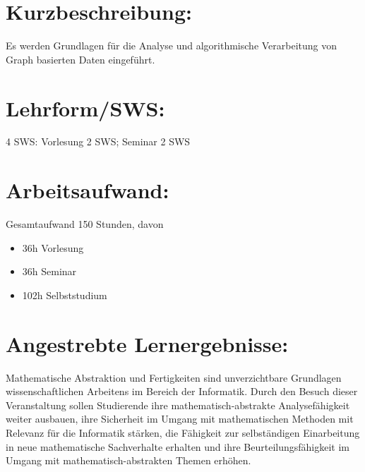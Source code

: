 \section*{Kurzbeschreibung:\label{/mi-2017/modulbeschreibungen-master/MA_All_Modul_Mathematik}}\label{kurzbeschreibungpathlabelmi-2017modulbeschreibungen-mastermaux5fallux5fmodulux5fmathematik}

Es werden Grundlagen für die Analyse und algorithmische Verarbeitung von
Graph basierten Daten eingeführt.

\section*{Lehrform/SWS:\label{/mi-2017/modulbeschreibungen-master/MA_All_Modul_Mathematik}}\label{lehrformswspathlabelmi-2017modulbeschreibungen-mastermaux5fallux5fmodulux5fmathematik}

4 SWS: Vorlesung 2 SWS; Seminar 2 SWS

\section*{Arbeitsaufwand:\label{/mi-2017/modulbeschreibungen-master/MA_All_Modul_Mathematik}}\label{arbeitsaufwandpathlabelmi-2017modulbeschreibungen-mastermaux5fallux5fmodulux5fmathematik}

Gesamtaufwand 150 Stunden, davon

\begin{itemize}
\tightlist
\item
  36h Vorlesung
\item
  36h Seminar
\item
  102h Selbststudium
\end{itemize}

\section*{Angestrebte
Lernergebnisse:\label{/mi-2017/modulbeschreibungen-master/MA_All_Modul_Mathematik}}\label{angestrebte-lernergebnissepathlabelmi-2017modulbeschreibungen-mastermaux5fallux5fmodulux5fmathematik}

Mathematische Abstraktion und Fertigkeiten sind unverzichtbare
Grundlagen wissenschaftlichen Arbeitens im Bereich der Informatik. Durch
den Besuch dieser Veranstaltung sollen Studierende ihre
mathematisch-abstrakte Analysefähigkeit weiter ausbauen, ihre Sicherheit
im Umgang mit mathematischen Methoden mit Relevanz für die Informatik
stärken, die Fähigkeit zur selbständigen Einarbeitung in neue
mathematische Sachverhalte erhalten und ihre Beurteilungsfähigkeit im
Umgang mit mathematisch-abstrakten Themen erhöhen.

